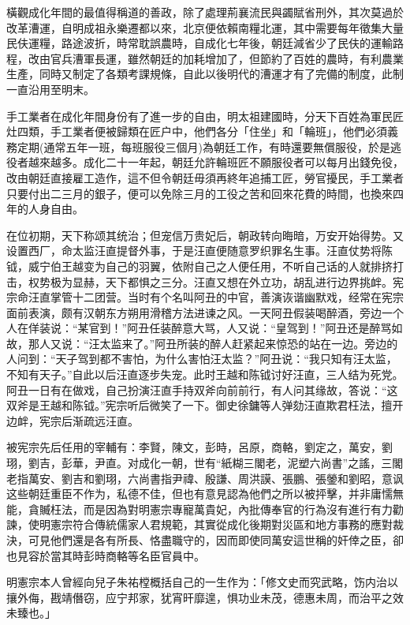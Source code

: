 橫觀成化年間的最值得稱道的善政，除了處理荊襄流民與蠲賦省刑外，其次莫過於改革漕運，自明成祖永樂遷都以來，北京便依賴南糧北運，其中需要每年徵集大量民伕運糧，路途波折，時常耽誤農時，自成化七年後，朝廷減省少了民伕的運輸路程，改由官兵漕軍長運，雖然朝廷的加耗增加了，但節約了百姓的農時，有利農業生產，同時又制定了各類考課規條，自此以後明代的漕運才有了完備的制度，此制一直沿用至明末。

手工業者在成化年間身份有了進一步的自由，明太祖建國時，分天下百姓為軍民匠灶四類，手工業者便被歸類在匠户中，他們各分「住坐」和「輪班」，他們必須義務定期(通常五年一班，每班服役三個月)為朝廷工作，有時還要無償服役，於是逃役者越來越多。成化二十一年起，朝廷允許輪班匠不願服役者可以每月出錢免役，改由朝廷直接雇工造作，這不但令朝廷毋須再終年追捕工匠，勞官擾民，手工業者只要付出二三月的銀子，便可以免除三月的工役之苦和回來花費的時間，也換來四年的人身自由。

在位初期，天下称颂其统治；但宠信万贵妃后，朝政转向晦暗，万安开始得势。又设置西厂，命太监汪直提督外事，于是汪直便随意罗织罪名生事。汪直仗势将陈钺，威宁伯王越变为自己的羽翼，依附自己之人便任用，不听自己话的人就排挤打击，权势极为显赫，天下都惧之三分。汪直又想在外立功，胡乱进行边界挑衅。宪宗命汪直掌管十二团营。当时有个名叫阿丑的中官，善演诙谐幽默戏，经常在宪宗面前表演，颇有汉朝东方朔用滑稽方法进谏之风。一天阿丑假装喝醉酒，旁边一个人在佯装说：“某官到！”阿丑任装醉意大骂，人又说：“皇驾到！”阿丑还是醉骂如故，那人又说：“汪太监来了。”阿丑所装的醉人赶紧起来惊恐的站在一边。旁边的人问到：“天子驾到都不害怕，为什么害怕汪太监？”阿丑说：“我只知有汪太监，不知有天子。”自此以后汪直逐步失宠。此时王越和陈钺讨好汪直，三人结为死党。阿丑一日有在做戏，自己扮演汪直手持双斧向前前行，有人问其缘故，答说：“这双斧是王越和陈钺。”宪宗听后微笑了一下。御史徐鏞等人弹劾汪直欺君枉法，擅开边衅，宪宗后渐疏远汪直。

被宪宗先后任用的宰輔有：李賢，陳文，彭時，呂原，商輅，劉定之，萬安，劉珝，劉吉，彭華，尹直。对成化一朝，世有“紙糊三閣老，泥塑六尚書”之謠，三閣老指萬安、劉吉和劉珝，六尚書指尹禕、殷謙、周洪謨、張鵬、張鎣和劉昭，意讽这些朝廷重臣不作为，私德不佳，但也有意見認為他們之所以被抨擊，并非庸懦無能，貪贓枉法，而是因為對明憲宗專寵萬貴妃，內批傳奉官的行為沒有進行有力勸諫，使明憲宗符合傳統儒家人君規範，其實從成化後期對災區和地方事務的應對裁決，可見他們還是各有所長、恪盡職守的，因而即使同萬安這世稱的奸倖之臣，卻也見容於當其時彭時商輅等名臣官員中。

明憲宗本人曾經向兒子朱祐樘概括自己的一生作为：「修文史而究武略，饬内治以攘外侮，戡靖僭窃，应宁邦家，犹宵旰靡遑，惧功业未茂，德惠未周，而治平之效未臻也。」

